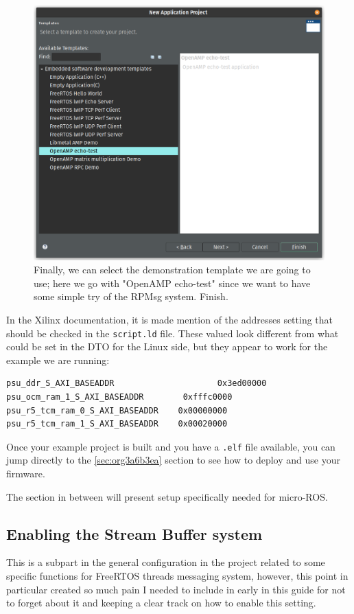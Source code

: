 \documentclass[10pt]{article}
\begin{document}
\begin{figure}[htbp]
\centering
\includegraphics[width=.6\textwidth]{./img/vitis_new/project7.png}
\caption{\label{fig:org370d461}Finally, we can select the demonstration template we are going to use; here we go with "OpenAMP echo-test" since we want to have some simple try of the RPMsg system. Finish.}
\end{figure}

\pagebreak
In the Xilinx documentation, it is made mention of the addresses setting that should be checked in the \texttt{script.ld} file.
These valued look different from what could be set in the DTO for the Linux side, but they appear to
work for the example we are running:

\begin{verbatim}
psu_ddr_S_AXI_BASEADDR                     0x3ed00000	
psu_ocm_ram_1_S_AXI_BASEADDR        0xfffc0000
psu_r5_tcm_ram_0_S_AXI_BASEADDR    0x00000000
psu_r5_tcm_ram_1_S_AXI_BASEADDR    0x00020000	
\end{verbatim}

Once your example project is built and you have a \texttt{.elf} file available, you can
jump directly to the \ref{sec:org3a6b3ea} section to see how to deploy and use your firmware.

The section in between will present setup specifically needed for micro-ROS.

\subsection{Enabling the Stream Buffer system}
\label{sec:orgee8d08c}
This is a subpart in the general configuration in the project related to some specific
functions for FreeRTOS threads messaging system, however, this point in particular
created so much pain I needed to include in early in this guide for not to forget about it
and keeping a clear track on how to enable this setting.
\end{document}
